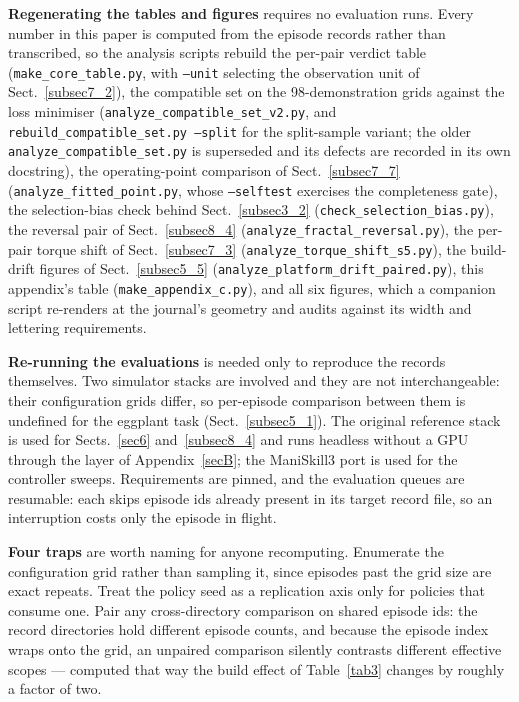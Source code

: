 \documentclass[pdflatex,iicol,sn-apa]{sn-jnl}
\theoremstyle{remark}
\begin{document}
\begin{appendices}
\textbf{Regenerating the tables and figures} requires no evaluation runs. Every number in this paper
is computed from the episode records rather than transcribed, so the analysis scripts rebuild the
per-pair verdict table (\texttt{make\_core\_table.py}, with \texttt{--unit} selecting the observation
unit of Sect.~\ref{subsec7_2}), the compatible set on the 98-demonstration grids against the loss
minimiser (\texttt{analyze\_compatible\_set\_v2.py}, and
\texttt{rebuild\_compatible\_set.py --split} for the split-sample variant; the older
\texttt{analyze\_compatible\_set.py} is superseded and its defects are recorded in its own
docstring), the operating-point comparison of Sect.~\ref{subsec7_7}
(\texttt{analyze\_fitted\_point.py}, whose \texttt{--selftest} exercises the completeness gate), the
selection-bias check behind Sect.~\ref{subsec3_2} (\texttt{check\_selection\_bias.py}), the reversal
pair of Sect.~\ref{subsec8_4} (\texttt{analyze\_fractal\_reversal.py}), the per-pair torque shift of
Sect.~\ref{subsec7_3} (\texttt{analyze\_torque\_shift\_s5.py}), the build-drift figures of
Sect.~\ref{subsec5_5} (\texttt{analyze\_platform\_drift\_paired.py}), this appendix's table
(\texttt{make\_appendix\_c.py}), and all six figures, which a companion script re-renders at the
journal's geometry and audits against its width and lettering requirements.

\textbf{Re-running the evaluations} is needed only to reproduce the records themselves. Two
simulator stacks are involved and they are not interchangeable: their configuration grids differ, so
per-episode comparison between them is undefined for the eggplant task (Sect.~\ref{subsec5_1}). The
original reference stack is used for Sects.~\ref{sec6} and~\ref{subsec8_4} and runs headless
without a GPU through the layer of Appendix~\ref{secB}; the ManiSkill3 port is used for the
controller sweeps. Requirements are pinned, and the evaluation queues are resumable: each skips
episode ids already present in its target record file, so an interruption costs only the episode in
flight.

\textbf{Four traps} are worth naming for anyone recomputing. Enumerate the configuration grid
rather than sampling it, since episodes past the grid size are exact repeats. Treat the policy seed
as a replication axis only for policies that consume one. Pair any cross-directory comparison on
shared episode ids: the record directories hold different episode counts, and because the episode
index wraps onto the grid, an unpaired comparison silently contrasts different effective scopes ---
computed that way the build effect of Table~\ref{tab3} changes by roughly a factor of two.


\end{appendices}
\end{document}
